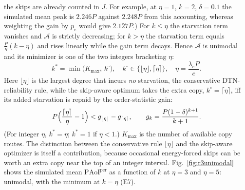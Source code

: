 \documentclass[twocolumn,3p,times,procedia]{elsarticle}
\theoremstyle{plain}
\theoremstyle{remark}
\newcommand{\PAoIper}{\mathrm{PAoI}^{\mathrm{per}}}
\newcommand{\peff}{p_e}
\newcommand{\kstar}{k^{\ast}}
\begin{document}
the skips are already counted in $J$. For example, at $\eta{=}1$,
$k{=}2$, $\delta{=}0.1$ the simulated mean peak is $2.246P$ against
$2.248P$ from this accounting, whereas weighting the gain by $\peff$
would give $2.127P$.)
For $k\le\eta$ the starvation term vanishes and $\mathcal{A}$ is strictly
decreasing; for $k>\eta$ the starvation term equals
$\frac{P}{\eta}(k-\eta)$ and rises linearly while the gain term decays.
Hence $\mathcal{A}$ is unimodal and its minimizer is one of the two
integers bracketing $\eta$:
\begin{equation}\label{eq:kstar}
\kstar=\min\bigl(K_{\max},\,k^{\circ}\bigr),\quad
k^{\circ}\in\{\lfloor\eta\rfloor,\lceil\eta\rceil\},\quad
\eta=\frac{\lambda_e P}{e}.
\end{equation}
Here $\lfloor\eta\rfloor$ is the largest degree that incurs \emph{no}
starvation, the conservative DTN-reliability rule, while the skip-aware
optimum takes the extra copy, $k^{\circ}{=}\lceil\eta\rceil$, iff its
added starvation is repaid by the order-statistic gain:
\begin{equation}\label{eq:ceiltest}
P\Bigl(\frac{\lceil\eta\rceil}{\eta}-1\Bigr)<g_{\lfloor\eta\rfloor}-g_{\lceil\eta\rceil},
\qquad g_k=\frac{P(1-\delta)^{k+1}}{k+1}.
\end{equation}
(For integer $\eta$, $\kstar{=}\eta$; $\kstar{=}1$ if $\eta<1$.)
$K_{\max}$ is the number of available copy routes. The
distinction between the conservative rule $\lfloor\eta\rfloor$ and the
skip-aware optimizer is itself a contribution, because occasional energy-forced
skips can be worth an extra copy near the top of an integer interval.
Fig.~\ref{fig:r3unimodal} shows the simulated mean $\PAoIper$ as a
function of $k$ at $\eta{=}3$ and $\eta{=}5$: unimodal, with the minimum
at $k{=}\eta$ (E7).
\end{document}
